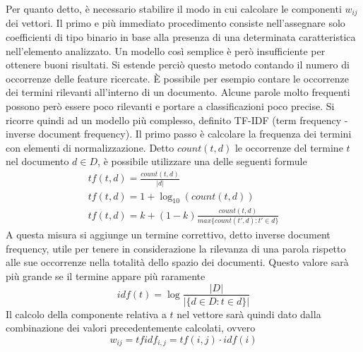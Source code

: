 \documentclass[Lau,binding=0.6cm,noexaminfo]{sapthesis}
\begin{document}
Per quanto detto, è necessario stabilire il modo in cui calcolare le componenti $w_{ij}$ dei vettori. Il primo e più immediato procedimento consiste nell'assegnare solo coefficienti di tipo binario in base alla presenza di una determinata caratteristica nell'elemento analizzato. Un modello così semplice è però insufficiente per ottenere buoni risultati. Si estende perciò questo metodo contando il numero di occorrenze delle feature ricercate.
\MakeUppercase{è} possibile per esempio contare le occorrenze dei termini rilevanti all'interno di un documento. Alcune parole molto frequenti possono però essere poco rilevanti e portare a classificazioni poco precise. Si ricorre quindi ad un modello più complesso, definito TF-IDF (term frequency - inverse document frequency). Il primo passo è calcolare la frequenza dei termini con elementi di normalizzazione. Detto $count(t,d)$ le occorrenze del termine $t$ nel documento $d \in D$, è possibile utilizzare una delle seguenti formule
\begin{gather*}
  tf(t,d) = \frac{count(t,d)}{|d|} \\
  tf(t,d) = 1 + \log_{10}(count(t,d)) \\
  tf(t,d) = k + (1-k) \frac{count(t,d)}{max\{count(t',d) : t' \in d\}}
\end{gather*}
A questa misura si aggiunge un termine correttivo, detto inverse document frequency, utile per tenere in considerazione la rilevanza di una parola rispetto alle sue occorrenze nella totalità dello spazio dei documenti. Questo valore sarà più grande se il termine appare più raramente
\[
idf(t) = \log \frac{|D|}{|\{d \in D : t \in d\}|}
\]
Il calcolo della componente relativa a $t$ nel vettore sarà quindi dato dalla combinazione dei valori precedentemente calcolati, ovvero
\[
w_{ij} = tfidf_{i,j} = tf(i,j) \cdot idf(i)
\]

\medskip
\end{document}
